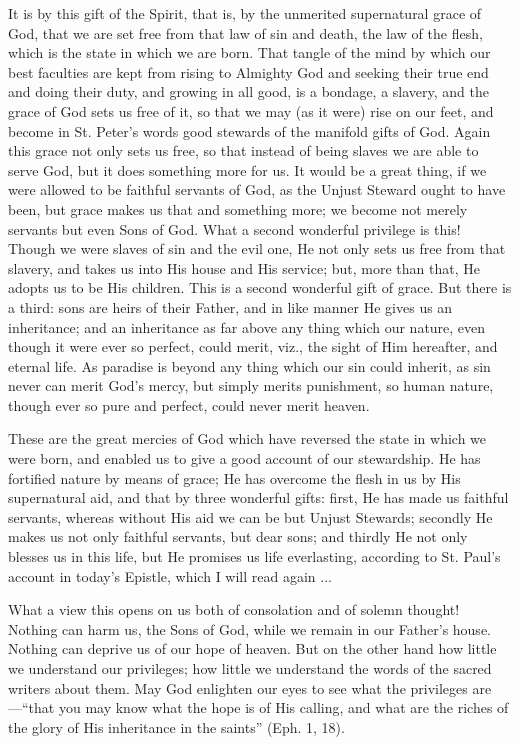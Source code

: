 It is by this gift of the Spirit, that is, by the
unmerited supernatural grace of God, that we are set free from
that law of sin and death, the law of the flesh, which is the state in
which we are born. That tangle of the mind by which our best faculties
are kept from rising to Almighty God and seeking their true end and
doing their duty, and growing in all good, is a bondage, a slavery,
and the grace of God sets us free of it, so that we may (as it were)
rise on our feet, and become in St. Peter's words good stewards of the
manifold gifts of God. Again this grace not only sets us free, so that
instead of being slaves we are able to serve God, but it does
something more for us. It would be a great thing, if we were allowed
to be faithful servants of God, as the Unjust Steward ought to have
been, but grace makes us that and something more; we become not merely
servants but even Sons of God. What a second wonderful privilege is
this! Though we were slaves of sin and the evil one, He not only sets
us free from that slavery, and takes us into His house and His
service; but, more than that, He adopts us to be His children. This is
a second wonderful gift of grace. But there is a third: sons are heirs
of their Father, and in like manner He gives us an inheritance; and an
inheritance as far above any thing which our nature, even though it
were ever so perfect, could merit, viz., the sight of Him hereafter,
and eternal life. As paradise is beyond any thing which our sin could
inherit, as sin never can merit God's mercy, but simply merits punishment, so human nature, though ever so pure and perfect, could
never merit heaven.

These are the great mercies of God which have
reversed the state in which we were born, and enabled us to give a
good account of our stewardship. He has fortified nature by means of
grace; He has overcome the flesh in us by His supernatural aid, and
that by three wonderful gifts: first, He has made us faithful
servants, whereas without His aid we can be but Unjust Stewards;
secondly He makes us not only faithful servants, but dear sons; and
thirdly He not only blesses us in this life, but He promises us life
everlasting, according to St. Paul's account in today's Epistle, which
I will read again ...

What a view this opens on us both of consolation
and of solemn thought! Nothing can harm us, the Sons of God, while we
remain in our Father's house. Nothing can deprive us of our hope of
heaven. But on the other hand how little we understand our privileges;
how little we understand the words of the sacred writers about them.
May God enlighten our eyes to see what the privileges are—``that
you may know what the hope is of His calling, and what are the riches
of the glory of His inheritance in the saints'' (Eph. 1, 18).


